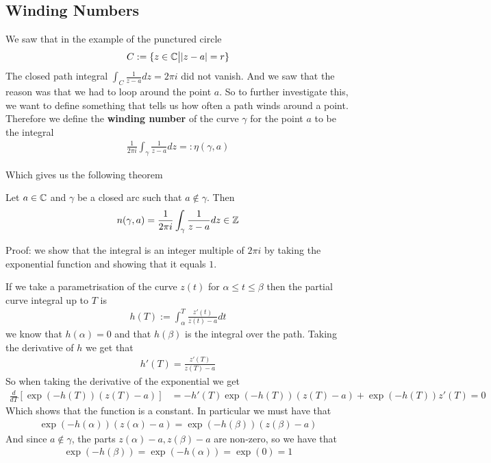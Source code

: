 \subsection{Winding Numbers}
We saw that in the example of the punctured circle 
\begin{align*}
	C := \{z \in \mathbb{C} \big\vert \vert z-a\vert = r\}
\end{align*}
The closed path integral $\int_{C} \frac{1}{z - a}dz = 2\pi i$ did not vanish.
And we saw that the reason was that we had to loop around the point $a$. So to further investigate this, we want to define something that tells us how often a path winds around a point. 
Therefore we define the \textbf{winding number} of the curve $\gamma$ for the point $a$ to be the integral
\begin{align*}
	\frac{1}{2\pi i} \int_{\gamma} \frac{1}{z-a}dz =: \eta(\gamma,a)
\end{align*}

Which gives us the following theorem
\begin{theorem}[]
	Let $a \in \mathbb{C}$ and $\gamma$ be a closed arc such that $a \notin \gamma$. Then
	\begin{align*}
		n(\gamma,a) = \frac{1}{2 \pi i} \int_{\gamma}\frac{1}{z-a}dz \in \mathbb{Z}
	\end{align*}
\end{theorem}
Proof: we show that the integral is an integer multiple of $2\pi i$ by taking the exponential function and showing that it equals $1$.

If we take a parametrisation of the curve $z(t)$ for $\alpha \leq t \leq \beta$ then the partial curve integral up to $T$ is
\begin{align*}
	h(T) := \int_{\alpha}^{T}\frac{z'(t)}{z(t) - a}dt
\end{align*}
we know that $h(\alpha) = 0$ and that $h(\beta)$ is the integral over the path. Taking the derivative of $h$ we get that
\begin{align*}
	h'(T) = \frac{z'(T)}{z(T) - a}
\end{align*}
So when taking the derivative of the exponential we get
\begin{align*}
	\frac{d}{d T} \left[\exp\left(-h(T)\right)\left(z(T) - a\right)\right] &= -h'(T) \exp(-h(T))(z(T) - a) + \exp(-h(T))z'(T) = 0
\end{align*}
Which shows that the function is a constant. In particular we must have that
\begin{align*}
	\exp(-h(\alpha))(z(\alpha) - a) = \exp(-h(\beta))(z(\beta) - a)
\end{align*}
And since $a \notin \gamma$, the parts $z(\alpha) - a, z(\beta) - a$ are non-zero, so we have that 
\begin{align*}
	\exp(-h(\beta)) = \exp(-h(\alpha)) = \exp(0) = 1
\end{align*}


